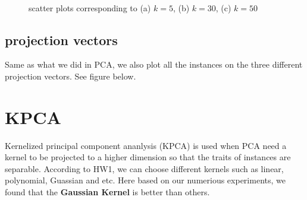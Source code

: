 \documentclass{article}
\begin{document}
   \begin{figure}[H]
   	\centering
   	
   	\\
   	\caption{scatter plots corresponding to (a) $k=5$, (b) $k=30$, (c) $k=50$}
   	\label{fig:pattern1}
   \end{figure}
\subsection{projection vectors}
Same as what we did in PCA, we also plot all the instances on the three different projection vectors. See figure below. 


\section{KPCA}
Kernelized principal component ananlysis (KPCA) is used when PCA need a kernel to be projected to a higher dimension so that the traits of instances are separable. According to HW1, we can choose different kernels such as linear, polynomial, Guassian and etc. Here based on our numerious experiments, we found that the \textbf{Gaussian Kernel} is better than others.  
 
\end{document}
